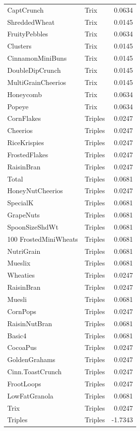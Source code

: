 \begin{longtable}{llr}
CaptCrunch & Trix & 0.0634 \\
ShreddedWheat & Trix & 0.0145 \\
FruityPebbles & Trix & 0.0634 \\
Clusters & Trix & 0.0145 \\
CinnamonMiniBuns & Trix & 0.0145 \\
DoubleDipCrunch & Trix & 0.0145 \\
MultiGrainCheerios & Trix & 0.0145 \\
Honeycomb & Trix & 0.0634 \\
Popeye & Trix & 0.0634 \\
CornFlakes & Triples & 0.0247 \\
Cheerios & Triples & 0.0247 \\
RiceKrispies & Triples & 0.0247 \\
FrostedFlakes & Triples & 0.0247 \\
RaisinBran & Triples & 0.0247 \\
Total & Triples & 0.0681 \\
HoneyNutCheerios & Triples & 0.0247 \\
SpecialK & Triples & 0.0681 \\
GrapeNuts & Triples & 0.0681 \\
SpoonSizeShdWt & Triples & 0.0681 \\
100%
FrostedMiniWheats & Triples & 0.0681 \\
NutriGrain & Triples & 0.0681 \\
Mueslix & Triples & 0.0681 \\
Wheaties & Triples & 0.0247 \\
RaisinBran & Triples & 0.0247 \\
Muesli & Triples & 0.0681 \\
CornPops & Triples & 0.0247 \\
RaisinNutBran & Triples & 0.0681 \\
Basic4 & Triples & 0.0681 \\
CocoaPus & Triples & 0.0247 \\
GoldenGrahams & Triples & 0.0247 \\
Cinn.ToastCrunch & Triples & 0.0247 \\
FrootLoops & Triples & 0.0247 \\
LowFatGranola & Triples & 0.0681 \\
Trix & Triples & 0.0247 \\
Triples & Triples & -1.7343 \\

\end{longtable}

